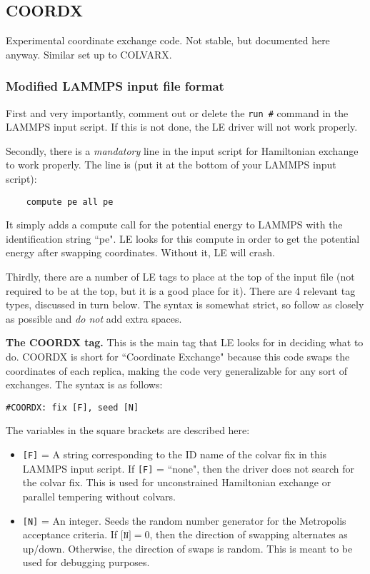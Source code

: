 \documentclass[10pt]{article}
\begin{document}
\subsection{COORDX}

Experimental coordinate exchange code. Not stable, but documented here anyway. Similar set up to COLVARX.

\subsubsection{Modified LAMMPS input file format}

First and very importantly, comment out
or delete the \texttt{run \#} command in the LAMMPS input script. If this is not done,
the LE driver will not work properly. 

Secondly, there is a {\em mandatory} line in the input script for Hamiltonian exchange to work properly.
The line is (put it at the bottom of your LAMMPS input script):
\begin{verbatim}
	compute pe all pe
\end{verbatim}
It simply adds a compute call for the potential energy to LAMMPS with the identification string ``pe". LE looks
for this compute in order to get the potential energy after swapping coordinates. Without it, LE will crash.

Thirdly, there are a number of LE tags to place
at the top of the input file (not required to be at the top, but it is a good place for it). 
There are 4 relevant tag types, discussed in turn below. The syntax is somewhat strict,
so follow as closely as possible and {\em do not} add extra spaces.

\textbf{The COORDX tag.}
This is the main tag that LE looks for in deciding what to do. COORDX is
short for ``Coordinate Exchange" because this code swaps the coordinates of each replica,
making the code very generalizable for any sort of exchanges.
The syntax is as follows:
\begin{verbatim}
#COORDX: fix [F], seed [N]
\end{verbatim}
The variables in the square brackets are described here:
\begin{itemize}
\item	\texttt{[F]} = A string corresponding to the ID name of the colvar fix
		in this LAMMPS input script. If \texttt{[F]} = ``none", then the driver does
		not search for the colvar fix. This is used for unconstrained Hamiltonian exchange
		or parallel tempering without colvars.
\item	\texttt{[N]} = An integer. Seeds the random number generator for the Metropolis
		acceptance criteria.
		If $\texttt{[N]} = 0$,
		then the direction of swapping alternates as up/down. Otherwise, the direction of swaps
		is random. This is meant to be used for debugging purposes.
\end{itemize}
\end{document}
